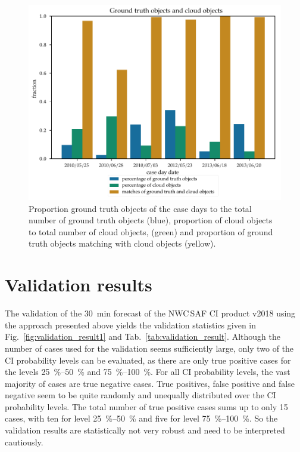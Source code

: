 \begin{figure}[htbp]
\centering
\includegraphics[width=\textwidth]{Grafiken/Abbildungen/haci_hrv_frequencies.pdf}
\caption{Proportion ground truth objects of the case days to the total number of ground truth objects (blue), proportion of cloud objects to total number of cloud objects, (green) and proportion of ground truth objects matching with cloud objects (yellow).}
\label{fig:haci_frequency}
\end{figure}

\section{Validation results}
The validation of the \SI{30}{\minute} forecast of the NWC\,SAF CI product v2018 using the approach presented above yields the validation statistics given in Fig.~\ref{fig:validation_result1} and Tab.~\ref{tab:validation_result}. Although the number of cases used for the validation seems sufficiently large, only two of the CI probability levels can be evaluated, as there are only true positive cases for the levels \SIrange{25}{50}{\percent} and \SIrange{75}{100}{\percent}. For all CI probability levels, the vast majority of cases are true negative cases. True positives, false positive and false negative seem to be quite randomly and unequally distributed over the CI probability levels. The total number of true positive cases sums up to only 15 cases, with ten for level \SIrange{25}{50}{\percent} and five for level \SIrange{75}{100}{\percent}. So the validation results are statistically not very robust and need to be interpreted cautiously. 

